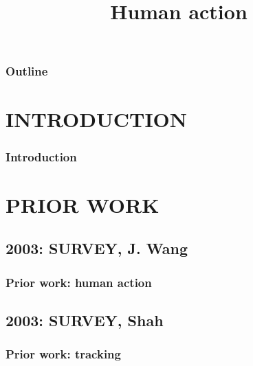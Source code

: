 
\title{Human action}
\begin{frame}[plain]\logoTechTower
	\titlepage
\end{frame}

\begin{frame}
\frametitle{Outline}
\logoCSIPCPL\logoTechTower
	\setcounter{tocdepth}{1}	
	\tableofcontents
\end{frame}

\section{INTRODUCTION}
\begin{frame}
\frametitle{Introduction}
\framesubtitle{}
\logoCSIPCPL\mypagenum
\end{frame}


\section{PRIOR WORK}



\subsection{2003: SURVEY, J. Wang}
\begin{frame}
\frametitle{Prior work: human action}
\framesubtitle{}
\mypagenum
{}
\end{frame}

\subsection{2003: SURVEY, Shah}
\begin{frame}
\frametitle{Prior work: tracking}
\framesubtitle{}
\mypagenum
{}
\end{frame}


